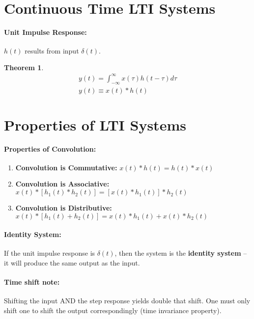 \documentclass[a4paper,12pt]{report}
\newtheorem{theorem}{Theorem}
\begin{document}
\section{Continuous Time LTI Systems}

\paragraph{Unit Impulse Response: } $h(t)$ results from input $\delta(t)$. 

\begin{theorem}
\begin{equation}
\begin{split}
y(t) = \int_{-\infty}^{\infty} x(\tau)h(t-\tau) d\tau \\
y(t) \equiv x(t) * h(t)
\end{split}
\end{equation}
\end{theorem}



\section{Properties of LTI Systems}

\paragraph{Properties of Convolution: } 
\begin{enumerate}
\item \textbf{Convolution is Commutative: } $x(t)*h(t) = h(t)*x(t)$
\item \textbf{Convolution is Associative: } $x(t)*[h_1(t)*h_2(t)] = [x(t)*h_1(t)]*h_2(t)$
\item \textbf{Convolution is Distributive: } $x(t)*[h_1(t) + h_2(t)] = x(t)*h_1(t) + x(t)*h_2(t)$
\end{enumerate}

\paragraph{Identity System: } If the unit impulse response is $\delta(t)$, then the system is the \textbf{identity system} -- it will produce the same output as the input.

\paragraph{Time shift note: } Shifting the input AND the step response yields double that shift. One must only shift one to shift the output correspondingly (time invariance property).
\end{document}
